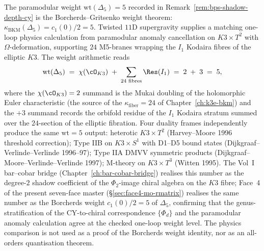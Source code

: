\begin{remark}
\label{rem:holdata-delta5-oneloop}
The paramodular weight $\mathrm{wt}(\Delta_5) = 5$ recorded in
Remark~\ref{rem:bps-shadow-depth-cy} is the Borcherds--Gritsenko
weight theorem:
	\(\kappa_{\mathrm{BKM}}(\Delta_5)=c_1(0)/2=5\).
Twisted $11$D supergravity supplies a matching one-loop physics calculation
from paramodular anomaly cancellation on
$K3 \times T^2$ with $\Omega$-deformation, supporting
$24$ M5-branes wrapping the $I_1$ Kodaira fibres of the elliptic $K3$.
The weight arithmetic reads
\[
 \mathrm{wt}(\Delta_5)
 \;=\; \chi(\cO_{K3}) \;+\; \sum_{\text{24 fibres}} \Res(I_1)
 \;=\; 2 \;+\; 3 \;=\; 5,
\]
where the $\chi(\cO_{K3}) = 2$ summand is the Mukai doubling of the
holomorphic Euler characteristic (the source of the
$\kappa_{\mathrm{fiber}} = 24$ of Chapter~\ref{ch:k3e-bkm}) and the
$+3$ summand records the orbifold residue of the $I_1$ Kodaira stratum
summed over the $24$-section of the elliptic fibration. Four duality
frames independently produce the same $\mathrm{wt} = 5$ output:
heterotic $K3 \times T^2$ (Harvey--Moore 1996 threshold correction);
Type IIB on $K3 \times S^1$ with D1--D5 bound states
(Dijkgraaf--Verlinde--Verlinde 1996--97); Type IIA DMVV symmetric
products (Dijkgraaf--Moore--Verlinde--Verlinde 1997); M-theory on
$K3 \times T^3$ (Witten 1995). The Vol~I bar--cobar bridge
(Chapter~\ref{ch:bar-cobar-bridge}) realises this number as the
degree-$2$ shadow coefficient of the $\Phi_2$-image chiral algebra on
the $K3$ fibre; Face~4 of the present seven-face master
(\S\ref{sec:face4-mo-rmatrix}) realises the same number as the
Borcherds weight $c_1(0)/2 = 5$ of $\Delta_5$, confirming that the
genus-stratification of the CY-to-chiral correspondence
$\{\Phi_d\}$ and the paramodular anomaly calculation agree at the
checked one-loop weight level. The physics comparison is not used as a
proof of the Borcherds weight identity, nor as an all-orders
quantisation theorem.
\end{remark}

